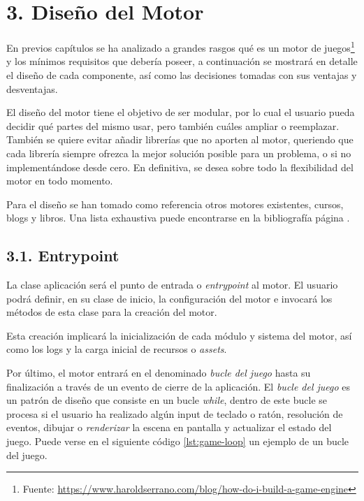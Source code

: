 \chapter*{3. Diseño del Motor}\label{cap:design}

En previos capítulos se ha analizado a grandes rasgos qué es un motor de 
juegos\footnote{Fuente: \url{https://www.haroldserrano.com/blog/how-do-i-build-a-game-engine}}
y los mínimos requisitos que debería poseer, a continuación se mostrará en detalle el diseño de cada
componente, así como las decisiones tomadas con sus ventajas y desventajas.

El diseño del motor tiene el objetivo de ser modular, por lo cual el usuario pueda decidir qué partes del mismo usar, 
pero también cuáles ampliar o reemplazar. También se quiere evitar añadir librerías que no aporten al motor, 
queriendo que cada librería siempre ofrezca la mejor solución posible para un problema, o si no implementándose desde cero.
En definitiva, se desea sobre todo la flexibilidad del motor en todo momento.

Para el diseño se han tomado como referencia otros motores existentes, cursos, blogs y libros\cite{hazel}\cite{master-course}\cite{engine-book}\cite{game-patterns}. Una lista
exhaustiva puede encontrarse en la bibliografía página \pageref{cap:bibliography}.

\section*{3.1. Entrypoint}\label{sec:entrypoint}
La clase aplicación será el punto de entrada o \textit{entrypoint} al motor. El usuario podrá definir, en su clase de inicio, 
la configuración del motor e invocará los métodos de esta clase para la creación del motor. 

Esta creación implicará la inicialización de cada módulo y sistema del motor, así como los logs y la carga inicial
de recursos o \textit{assets}. 

Por último, el motor entrará en el denominado \textit{bucle del juego} hasta su finalización a través de un evento
de cierre de la aplicación. El \textit{bucle del juego} es un patrón de diseño\cite{game-loop-pattern} que consiste
en un bucle \textit{while}, dentro de este bucle se procesa si el usuario ha realizado algún input de teclado o ratón,
resolución de eventos, dibujar o \textit{renderizar} la escena en pantalla y actualizar el estado del juego.
Puede verse en el siguiente código \ref{lst:game-loop} un ejemplo de un bucle del juego.

